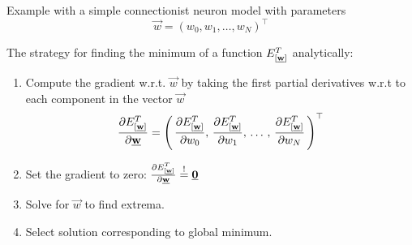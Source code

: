 \begin{frame}\frametitle{\subsecname}

    Example with a simple connectionist neuron model
    with parameters
    $$\vec w = (w_{0}, w_{1}, \ldots, w_{N})^{\top}$$

    The strategy for finding the minimum of a function ${E}^T_{[\underline{\mathbf{w}}]}$ analytically:
    \begin{enumerate}
    \item<1-> Compute the gradient w.r.t. $\vec w$ by taking the first partial derivatives w.r.t to each component in the vector $\vec w$
    \begin{equation}
        \frac{\partial {E}^T_{[\underline{\mathbf{w}}]}}{\partial \underline{\mathbf{w}}} = \left(\,
        \frac{\partial {E}^T_{[\underline{\mathbf{w}}]}}{\partial w_{0}}, \,
        \frac{\partial {E}^T_{[\underline{\mathbf{w}}]}}{\partial w_{1}}, \,\ldots\,,\, 
        \frac{\partial {E}^T_{[\underline{\mathbf{w}}]}}{\partial w_{N}}\,
        \right)^{\top}
        \label{eq:gradient_partial}
    \end{equation}
    
    \item<2-> Set the gradient to zero: $\frac{\partial {E}^T_{[\underline{\mathbf{w}}]}}{\partial \underline{\mathbf{w}}} \stackrel{\mathrm{!}}{=} \underline{\mathbf{0}}$
    \item<3-> Solve for $\vec w$ to find extrema.
    \item<4-> Select solution corresponding to global minimum.
    
    \end{enumerate}
\end{frame}


